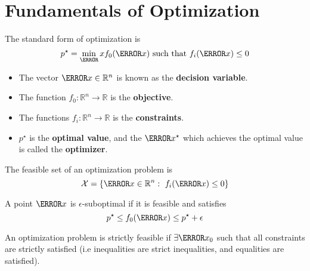 \section{Fundamentals of Optimization}
\begin{definition}
	The standard form of optimization is \[
		p^\star = \min_\V{x} f_0(\V{x}) \text{ such that } f_i(\V{x}) \leq 0
	\]
	\label{defn:optimization}
\end{definition}
\begin{itemize}
	\item The vector $\V{x}\in\mathbb{R}^n$ is known as the \textbf{decision variable}.
	\item The function $f_0:\mathbb{R}^n\to\mathbb{R}$ is the \textbf{objective}.
	\item The functions $f_i:\mathbb{R}^n\to\mathbb{R}$ is the \textbf{constraints}.
	\item $p^\star$ is the \textbf{optimal value}, and the $\V{x}^\star$ which achieves the optimal value is called the \textbf{optimizer}.
\end{itemize}
\begin{definition}
	The feasible set of an  optimization problem is \[
		\mathcal{X} = \{\V{x}\in\mathbb{R}^n:\ f_i(\V{x}) \leq 0 \}
	\]
	\label{defn:feasible-set}
\end{definition}
\begin{definition}
	A point $\V{x}$ is $\epsilon$-suboptimal if it is feasible and satisfies \[
		p^\star \leq f_0(\V{x}) \leq p^\star + \epsilon
	\]
	\label{defn:suboptimal}
\end{definition}
\begin{definition}
	An optimization problem is strictly feasible if $\exists \V{x}_0$ such that all constraints are strictly satisfied (i.e inequalities are strict inequalities, and equalities are satisfied).
	\label{defn:strictly-feasible}
\end{definition}
